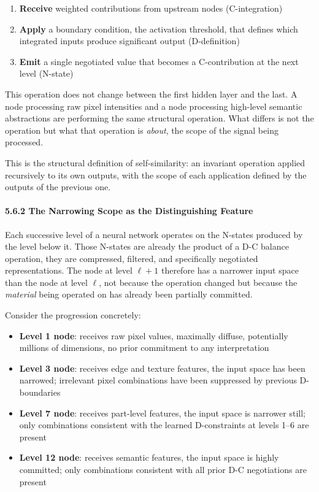 \documentclass[
  11pt,
  letterpaper,
]{article}
\providecommand{\tightlist}{%
  \setlength{\itemsep}{0pt}\setlength{\parskip}{0pt}}
\begin{document}
\begin{enumerate}
\def\labelenumi{\arabic{enumi}.}
\tightlist
\item
  \textbf{Receive} weighted contributions from upstream nodes
  (C-integration)
\item
  \textbf{Apply} a boundary condition, the activation threshold, that
  defines which integrated inputs produce significant output
  (D-definition)
\item
  \textbf{Emit} a single negotiated value that becomes a C-contribution
  at the next level (N-state)
\end{enumerate}

This operation does not change between the first hidden layer and the
last. A node processing raw pixel intensities and a node processing
high-level semantic abstractions are performing the same structural
operation. What differs is not the operation but what that operation is
\emph{about}, the scope of the signal being processed.

This is the structural definition of self-similarity: an invariant
operation applied recursively to its own outputs, with the scope of each
application defined by the outputs of the previous one.

\paragraph{5.6.2 The Narrowing Scope as the Distinguishing
Feature}\label{the-narrowing-scope-as-the-distinguishing-feature}

Each successive level of a neural network operates on the N-states
produced by the level below it. Those N-states are already the product
of a D-C balance operation, they are compressed, filtered, and
specifically negotiated representations. The node at level \(\ell+1\)
therefore has a narrower input space than the node at level \(\ell\),
not because the operation changed but because the \emph{material} being
operated on has already been partially committed.

Consider the progression concretely:

\begin{itemize}
\tightlist
\item
  \textbf{Level 1 node}: receives raw pixel values, maximally diffuse,
  potentially millions of dimensions, no prior commitment to any
  interpretation
\item
  \textbf{Level 3 node}: receives edge and texture features, the input
  space has been narrowed; irrelevant pixel combinations have been
  suppressed by previous D-boundaries
\item
  \textbf{Level 7 node}: receives part-level features, the input space
  is narrower still; only combinations consistent with the learned
  D-constraints at levels 1--6 are present
\item
  \textbf{Level 12 node}: receives semantic features, the input space is
  highly committed; only combinations consistent with all prior D-C
  negotiations are present
\end{itemize}
\end{document}
